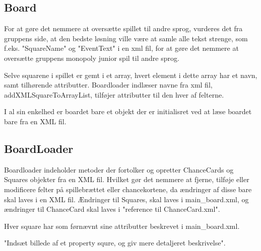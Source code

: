 \documentclass[../../main.tex]{subfiles}
\begin{document}
\begin{flushleft}


\subsection{Board}

For at gøre det nemmere at oversætte spillet til andre sprog, vurderes det fra gruppens side, at den bedste løsning ville være at samle alle tekst strenge, som f.eks. "SquareName" og "EventText" i en xml fil, for at gøre det nemmere at oversætte gruppens monopoly junior spil til andre sprog. 

Selve squarene i spillet er gemt i et array, hvert element i dette array har et navn, samt tilhørende attributter. 
Boardloader indlæser navne fra xml fil, addXMLSquareToArrayList, tilføjer attributter til den hver af felterne.

I al sin enkelhed er boardet bare et objekt der er initialisret ved at læse boardet bare fra en XML fil.

\subsection{BoardLoader}

Boardloader indeholder metoder der fortolker og opretter ChanceCards og Squares objekter fra en XML fil. Hvilket gør det nemmere at fjerne, tilføje eller modificere felter på spillebrættet eller chancekortene, da ændringer af disse bare skal laves i en XML fil. Ændringer til Squares, skal laves i main\_board.xml, og ændringer til ChanceCard skal laves i "reference til ChanceCard.xml". 

Hver square har som førnævnt sine attributter beskrevet i main\_board.xml. 

"Indsæt billede af et property squre, og giv mere detaljeret beskrivelse".
\end{flushleft}
\end{document}
